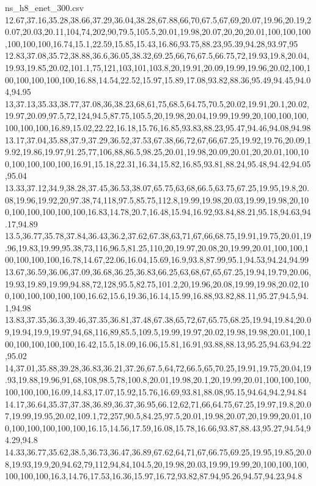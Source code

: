 \begin{filecontents*}[overwrite]{ns_h8_enet_300.csv}
12.67,37.16,35.28,38.66,37.29,36.04,38.28,67.88,66,70,67.5,67,69,20.07,19.96,20.19,20.07,20.03,20.11,104,74,202,90,79.5,105.5,20.01,19.98,20.07,20,20,20.01,100,100,100,100,100,100,16.74,15.1,22.59,15.85,15.43,16.86,93.75,88.23,95.39,94.28,93.97,95
12.83,37.08,35.72,38.88,36.6,36.05,38.32,69.25,66,76,67.5,66.75,72,19.93,19.8,20.04,19.93,19.85,20.02,101.1,75,121,103,101,103.8,20,19.91,20.09,19.99,19.96,20.02,100,100,100,100,100,100,16.88,14.54,22.52,15.97,15.89,17.08,93.82,88.36,95.49,94.45,94.04,94.95
13,37.13,35.33,38.77,37.08,36,38.23,68,61,75,68.5,64.75,70.5,20.02,19.91,20.1,20.02,19.97,20.09,97.5,72,124,94.5,87.75,105.5,20,19.98,20.04,19.99,19.99,20,100,100,100,100,100,100,16.89,15.02,22.22,16.18,15.76,16.85,93.83,88.23,95.47,94.46,94.08,94.98
13.17,37.04,35.88,37.9,37.29,36.52,37.53,67.38,66,72,67,66,67.25,19.92,19.76,20.09,19.92,19.86,19.97,91.25,77,106,88,86.5,98.25,20.01,19.98,20.09,20.01,20,20.01,100,100,100,100,100,100,16.91,15.18,22.31,16.34,15.82,16.85,93.81,88.24,95.48,94.42,94.05,95.04
13.33,37.12,34.9,38.28,37.45,36.53,38.07,65.75,63,68,66.5,63.75,67.25,19.95,19.8,20.08,19.96,19.92,20,97.38,74,118,97.5,85.75,112.8,19.99,19.98,20.03,19.99,19.98,20,100,100,100,100,100,100,16.83,14.78,20.7,16.48,15.94,16.92,93.84,88.21,95.18,94.63,94.17,94.89
13.5,36.77,35.78,37.84,36.43,36.2,37.62,67.38,63,71,67,66,68.75,19.91,19.75,20.01,19.96,19.83,19.99,95.38,73,116,96.5,81.25,110,20,19.97,20.08,20,19.99,20.01,100,100,100,100,100,100,16.78,14.67,22.06,16.04,15.69,16.9,93.8,87.99,95.1,94.53,94.24,94.99
13.67,36.59,36.06,37.09,36.68,36.25,36.83,66.25,63,68,67,65,67.25,19.94,19.79,20.06,19.93,19.89,19.99,94.88,72,128,95.5,82.75,101.2,20,19.96,20.08,19.99,19.98,20.02,100,100,100,100,100,100,16.62,15.6,19.36,16.14,15.99,16.88,93.82,88.11,95.27,94.5,94.1,94.98
13.83,37.35,36.3,39.46,37.35,36.81,37.48,67.38,65,72,67,65.75,68.25,19.94,19.84,20.09,19.94,19.9,19.97,94,68,116,89,85.5,109.5,19.99,19.97,20.02,19.98,19.98,20.01,100,100,100,100,100,100,16.42,15.5,18.09,16.06,15.81,16.91,93.88,88.13,95.25,94.63,94.22,95.02
14,37.01,35.88,39.28,36.83,36.21,37.26,67.5,64,72,66.5,65,70.25,19.91,19.75,20.04,19.93,19.88,19.96,91,68,108,98.5,78,100.8,20.01,19.98,20.1,20,19.99,20.01,100,100,100,100,100,100,16.09,14.83,17.07,15.92,15.76,16.69,93.81,88.08,95.15,94.64,94.2,94.84
14.17,36.64,35.37,37.38,36.89,36.37,36.95,66.12,62,71,66,64.75,67.25,19.97,19.8,20.07,19.99,19.95,20.02,109.1,72,257,90.5,84.25,97.5,20.01,19.98,20.07,20,19.99,20.01,100,100,100,100,100,100,16.15,14.56,17.59,16.08,15.78,16.66,93.87,88.43,95.27,94.54,94.29,94.8
14.33,36.77,35.62,38.5,36.73,36.47,36.89,67.62,64,71,67,66.75,69.25,19.95,19.85,20.08,19.93,19.9,20,94.62,79,112,94,84,104.5,20,19.98,20.03,19.99,19.99,20,100,100,100,100,100,100,16.3,14.76,17.53,16.36,15.97,16.72,93.82,87.94,95.26,94.57,94.23,94.8

\end{filecontents*}
